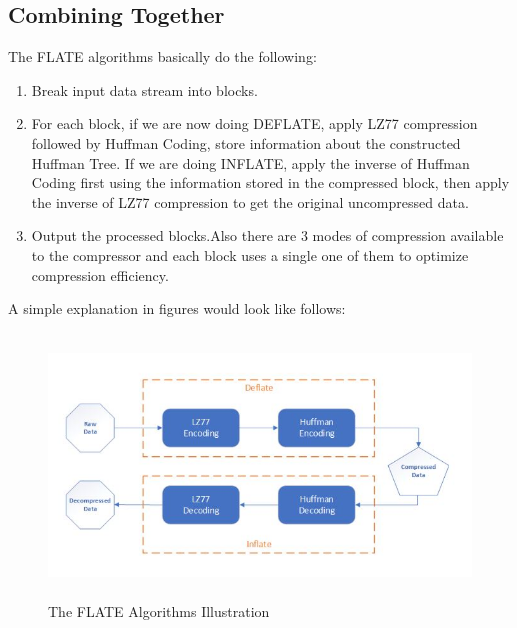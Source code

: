 \documentclass[12pt]{article}
\begin{document}
    \subsection{Combining Together}
    The FLATE algorithms basically do the following:
    \begin{enumerate}
        \item Break input data stream into blocks.
        \item For each block, if we are now doing DEFLATE, apply LZ77 compression followed by Huffman Coding, store information about the constructed Huffman Tree. If we are doing INFLATE, apply the inverse of Huffman Coding first using the information stored in the compressed block, then apply the inverse of LZ77 compression to get the original uncompressed data.
        \item Output the processed blocks.Also there are 3 modes of compression available to the compressor and each block uses a single one of them to optimize compression efficiency.\\
    \end{enumerate}
    A simple explanation in figures would look like follows:
    \newpage
    \begin{figure}[!h]
    \begin{center}
    \includegraphics[height=7cm]{Diagram.JPG}
    \caption{The FLATE Algorithms Illustration}
    \end{center}
    \end{figure}
\end{document}
